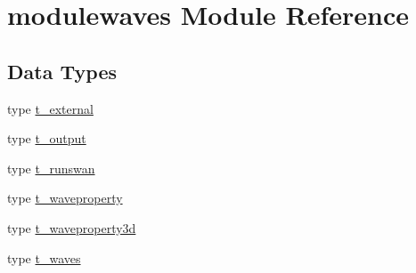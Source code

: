 \hypertarget{namespacemodulewaves}{}\section{modulewaves Module Reference}
\label{namespacemodulewaves}
\subsection*{Data Types}
\begin{DoxyCompactItemize}
\item 
type \mbox{\hyperlink{structmodulewaves_1_1t__external}{t\+\_\+external}}
\item 
type \mbox{\hyperlink{structmodulewaves_1_1t__output}{t\+\_\+output}}
\item 
type \mbox{\hyperlink{structmodulewaves_1_1t__runswan}{t\+\_\+runswan}}
\item 
type \mbox{\hyperlink{structmodulewaves_1_1t__waveproperty}{t\+\_\+waveproperty}}
\item 
type \mbox{\hyperlink{structmodulewaves_1_1t__waveproperty3d}{t\+\_\+waveproperty3d}}
\item 
type \mbox{\hyperlink{structmodulewaves_1_1t__waves}{t\+\_\+waves}}
\end{DoxyCompactItemize}
